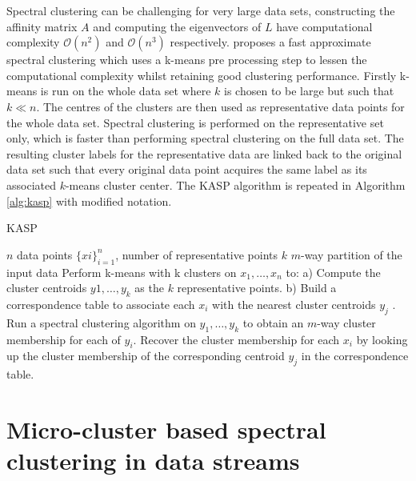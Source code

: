\documentclass[12pt]{report}		%
\begin{document}
Spectral clustering can be challenging for very large data sets, constructing the affinity matrix $A$ and computing the eigenvectors of $L$ have computational complexity $\mathcal{O}(n^2)$ and $\mathcal{O}(n^3)$ respectively. \cite{Yan2009} proposes a fast approximate spectral clustering which uses a k-means pre processing step to lessen the computational complexity whilst retaining good clustering performance. Firstly k-means is run on the whole data set where $k$ is chosen to be large but such that $k \ll n$. The centres of the clusters are then used as representative data points for the whole data set. Spectral clustering is performed on the representative set only, which is faster than performing spectral clustering on the full data set. The resulting cluster labels for the representative data are linked back to the original data set such that every original data point acquires the same label as its associated $k$-means cluster center. The KASP algorithm is repeated in Algorithm \ref{alg:kasp} with modified notation.

\begin{algorithm}
\caption{KASP}
  \begin{algorithmic}[1]
   \REQUIRE $n$ data points $\{xi\}_{i = 1}^n$, number of representative points $k$
   \ENSURE  $m$-way partition of the input data
   \STATE Perform k-means with k clusters on $x_1, \hdots, x_n$ to:
   \STATE a) Compute the cluster centroids $y1, \hdots, y_k$ as the $k$ representative points.
   \STATE b) Build a correspondence table to associate each $x_i$ with the nearest cluster centroids $y_j$ .
   \STATE Run a spectral clustering algorithm on $y_1,\hdots, y_k$ to obtain an $m$-way cluster membership
   for each of $y_i$.
   \STATE Recover the cluster membership for each $x_i$ by looking up the cluster membership of the corresponding centroid $y_j$ in the correspondence table.
  \end{algorithmic}
\label{alg:kasp}
\end{algorithm}

\section{Micro-cluster based spectral clustering in data streams}
\label{sec:microSpec}
\end{document}
